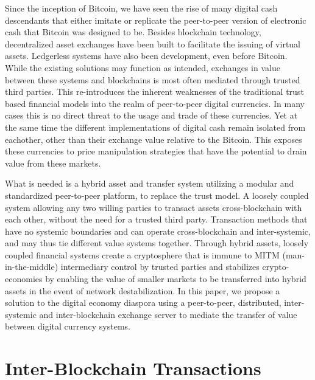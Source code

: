 \documentclass[a4paper,fullpack]{article}
\begin{document}
Since the inception of Bitcoin, we have seen the rise of many digital cash descendants that either imitate or replicate the peer-to-peer version of electronic cash that Bitcoin was designed to be. Besides blockchain technology, decentralized asset exchanges\cite{counterparty} have been built to facilitate the issuing of virtual assets. Ledgerless \cite{opentransactions} systems have also been development, even before Bitcoin. While the existing solutions may function as intended, exchanges in value between these systems and blockchains is most often mediated through trusted third parties. This re-introduces the inherent weaknesses of the traditional trust based financial models into the realm of peer-to-peer digital currencies. In many cases this is no direct threat to the usage and trade of these currencies. Yet at the same time the different implementations of digital cash remain isolated from eachother, other than their exchange value relative to the Bitcoin. This exposes these currencies to price manipulation strategies that have the potential to drain value from these markets. \cite{panture}

What is needed is a hybrid asset and transfer system utilizing a modular and standardized peer-to-peer platform, to replace the trust model. A loosely coupled system\cite{EDA} allowing any two willing parties to transact assets cross-blockchain with each other, without the need for a trusted third party. Transaction methods that have no systemic boundaries and can operate cross-blockchain and inter-systemic, and may thus tie different value systems together. Through hybrid assets, loosely coupled financial systems create a cryptosphere that is immune to MITM (man-in-the-middle) intermediary control by trusted parties and stabilizes crypto-economies by enabling the value of smaller markets to be transferred into hybrid assets in the event of network destabilization. In this paper, we propose a solution to the digital economy diaspora using a peer-to-peer, distributed, inter-systemic and inter-blockchain exchange server to mediate the transfer of value between digital currency systems.


\section{Inter-Blockchain Transactions}
\end{document}
